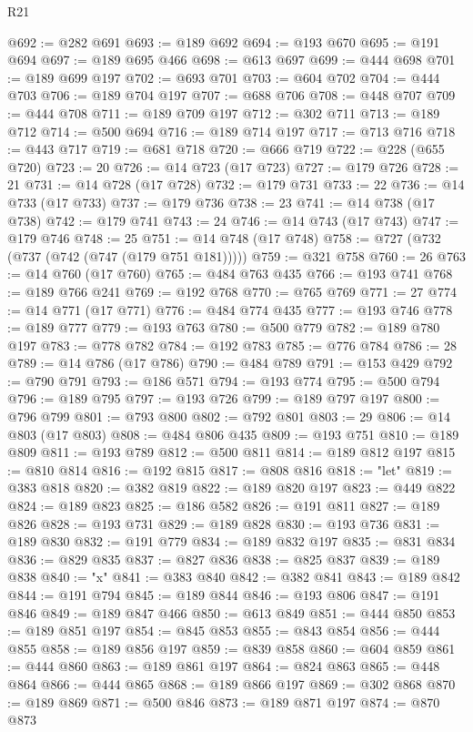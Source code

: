 \begin{lexlean}{R21}
\begin{coremodule}
@692 := @282 @691
@693 := @189 @692
@694 := @193 @670
@695 := @191 @694
@697 := @189 @695 @466
@698 := @613 @697
@699 := @444 @698
@701 := @189 @699 @197
@702 := @693 @701
@703 := @604 @702
@704 := @444 @703
@706 := @189 @704 @197
@707 := @688 @706
@708 := @448 @707
@709 := @444 @708
@711 := @189 @709 @197
@712 := @302 @711
@713 := @189 @712
@714 := @500 @694
@716 := @189 @714 @197
@717 := @713 @716
@718 := @443 @717
@719 := @681 @718
@720 := @666 @719
@722 := @228 (@655 @720)
@723 := 20
@726 := @14 @723 (@17 @723)
@727 := @179 @726
@728 := 21
@731 := @14 @728 (@17 @728)
@732 := @179 @731
@733 := 22
@736 := @14 @733 (@17 @733)
@737 := @179 @736
@738 := 23
@741 := @14 @738 (@17 @738)
@742 := @179 @741
@743 := 24
@746 := @14 @743 (@17 @743)
@747 := @179 @746
@748 := 25
@751 := @14 @748 (@17 @748)
@758 := @727 (@732 (@737 (@742 (@747 (@179 @751 @181)))))
@759 := @321 @758
@760 := 26
@763 := @14 @760 (@17 @760)
@765 := @484 @763 @435
@766 := @193 @741
@768 := @189 @766 @241
@769 := @192 @768
@770 := @765 @769
@771 := 27
@774 := @14 @771 (@17 @771)
@776 := @484 @774 @435
@777 := @193 @746
@778 := @189 @777
@779 := @193 @763
@780 := @500 @779
@782 := @189 @780 @197
@783 := @778 @782
@784 := @192 @783
@785 := @776 @784
@786 := 28
@789 := @14 @786 (@17 @786)
@790 := @484 @789
@791 := @153 @429
@792 := @790 @791
@793 := @186 @571
@794 := @193 @774
@795 := @500 @794
@796 := @189 @795
@797 := @193 @726
@799 := @189 @797 @197
@800 := @796 @799
@801 := @793 @800
@802 := @792 @801
@803 := 29
@806 := @14 @803 (@17 @803)
@808 := @484 @806 @435
@809 := @193 @751
@810 := @189 @809
@811 := @193 @789
@812 := @500 @811
@814 := @189 @812 @197
@815 := @810 @814
@816 := @192 @815
@817 := @808 @816
@818 := "let"
@819 := @383 @818
@820 := @382 @819
@822 := @189 @820 @197
@823 := @449 @822
@824 := @189 @823
@825 := @186 @582
@826 := @191 @811
@827 := @189 @826
@828 := @193 @731
@829 := @189 @828
@830 := @193 @736
@831 := @189 @830
@832 := @191 @779
@834 := @189 @832 @197
@835 := @831 @834
@836 := @829 @835
@837 := @827 @836
@838 := @825 @837
@839 := @189 @838
@840 := "x"
@841 := @383 @840
@842 := @382 @841
@843 := @189 @842
@844 := @191 @794
@845 := @189 @844
@846 := @193 @806
@847 := @191 @846
@849 := @189 @847 @466
@850 := @613 @849
@851 := @444 @850
@853 := @189 @851 @197
@854 := @845 @853
@855 := @843 @854
@856 := @444 @855
@858 := @189 @856 @197
@859 := @839 @858
@860 := @604 @859
@861 := @444 @860
@863 := @189 @861 @197
@864 := @824 @863
@865 := @448 @864
@866 := @444 @865
@868 := @189 @866 @197
@869 := @302 @868
@870 := @189 @869
@871 := @500 @846
@873 := @189 @871 @197
@874 := @870 @873

\end{coremodule}
\end{lexlean}

